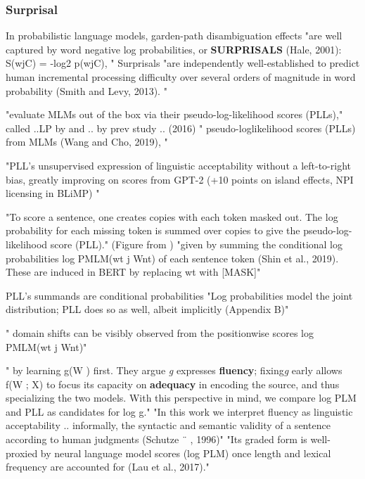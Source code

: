 \subsubsection{Surprisal}

In probabilistic language models, garden-path disambiguation effects "are well captured by word negative log probabilities, or \textbf{SURPRISALS} (Hale, 2001): S(wjC) = -log2 p(wjC), " \citep{hu2020systematic}
Surprisals "are independently well-established to predict human incremental processing difficulty over several orders of magnitude in word probability (Smith and Levy, 2013). " \citep{hu2020systematic}


"evaluate MLMs out of the box via their
pseudo-log-likelihood scores (PLLs)," \citep{salazar2020masked}
called ..LP by \citep{lau2020furiously} and .. by prev study .. (2016)
" pseudo-loglikelihood scores (PLLs) from MLMs (Wang and
Cho, 2019), " \citep{salazar2020masked}

"PLL’s unsupervised expression of linguistic acceptability without a
left-to-right bias, greatly improving on scores
from GPT-2 (+10 points on island effects, NPI
licensing in BLiMP) " \citep{salazar2020masked}

"To score a sentence, one creates copies
with each token masked out. The log probability for
each missing token is summed over copies to give the
pseudo-log-likelihood score (PLL)." (Figure from \citet{salazar2020masked})
"given by summing the conditional log
probabilities log PMLM(wt j Wnt) of each sentence token (Shin et al., 2019). These are induced
in BERT by replacing wt with [MASK]" \citep{salazar2020masked}

PLL’s summands  are conditional probabilities   \citep{salazar2020masked}
"Log probabilities model the joint distribution; PLL does so as well, albeit implicitly (Appendix B)"  \citep{salazar2020masked}

" domain shifts can be visibly observed from the positionwise scores log PMLM(wt j Wnt)" \citep{salazar2020masked}

" by learning g(W ) first. They argue \textit{g} expresses \textbf{fluency}; fixing\textit{g} early allows f(W ; X) to focus its capacity on \textbf{adequacy} in encoding the source, and thus specializing the two models. With this perspective in mind, we compare log PLM and PLL as candidates for log g."  \citep{salazar2020masked}
"In this work we interpret fluency as linguistic acceptability ..  informally, the syntactic and semantic validity of a sentence according to human judgments (Schutze ¨ , 1996)" \citep{salazar2020masked} "Its graded form is well-proxied by neural language model scores (log PLM) once length and lexical frequency
are accounted for (Lau et al., 2017)."  \citep{salazar2020masked}



